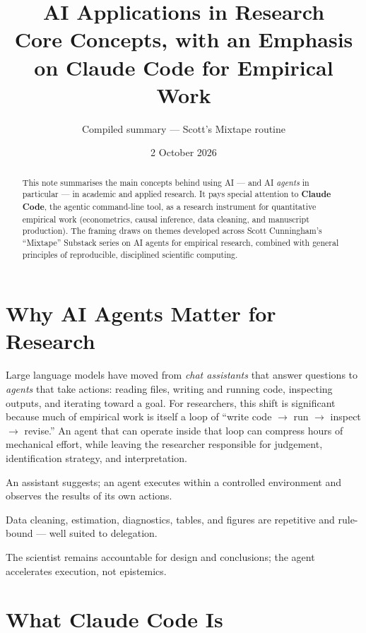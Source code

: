 \documentclass[11pt]{article}
\title{\textbf{AI Applications in Research}\\[0.3em]
\large Core Concepts, with an Emphasis on Claude Code for Empirical Work}
\author{Compiled summary --- Scott's Mixtape routine}
\date{2 October 2026}
\begin{document}
\maketitle

\begin{abstract}
\noindent This note summarises the main concepts behind using AI --- and
AI \emph{agents} in particular --- in academic and applied research. It pays
special attention to \textbf{Claude Code}, the agentic command-line tool, as a
research instrument for quantitative empirical work (econometrics, causal
inference, data cleaning, and manuscript production). The framing draws on
themes developed across Scott Cunningham's ``Mixtape'' Substack series on AI
agents for empirical research, combined with general principles of reproducible,
disciplined scientific computing.
\end{abstract}

\section{Why AI Agents Matter for Research}

Large language models have moved from \emph{chat assistants} that answer
questions to \emph{agents} that take actions: reading files, writing and running
code, inspecting outputs, and iterating toward a goal. For researchers, this
shift is significant because much of empirical work is itself a loop of
``write code $\rightarrow$ run $\rightarrow$ inspect $\rightarrow$ revise.''
An agent that can operate inside that loop can compress hours of mechanical
effort, while leaving the researcher responsible for judgement, identification
strategy, and interpretation.

\begin{description}[leftmargin=1.4em, style=nextline]
  \item[Assistant vs.\ agent] An assistant suggests; an agent executes within a
  controlled environment and observes the results of its own actions.
  \item[The research loop] Data cleaning, estimation, diagnostics, tables, and
  figures are repetitive and rule-bound --- well suited to delegation.
  \item[Human in the loop] The scientist remains accountable for design and
  conclusions; the agent accelerates execution, not epistemics.
\end{description}

\section{What Claude Code Is}
\end{document}

